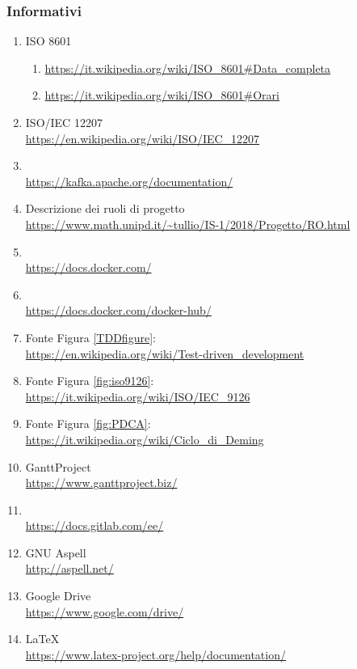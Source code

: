     \subsubsection{Informativi}	\label{rifinfo}
    \begin{enumerate}
    	\item ISO 8601
    	\begin{enumerate}
    		\item \url{https://it.wikipedia.org/wiki/ISO\_8601#Data_completa}
    		\item \url{https://it.wikipedia.org/wiki/ISO\_8601#Orari}
    	\end{enumerate}
    	\item ISO/IEC 12207 \\\url{https://en.wikipedia.org/wiki/ISO/IEC_12207}
		\item {} \\\url{https://kafka.apache.org/documentation/}
        \item Descrizione dei ruoli di progetto \\\url{https://www.math.unipd.it/~tullio/IS-1/2018/Progetto/RO.html}
        \item {} \\\url{https://docs.docker.com/}
        \item {} \\\url{https://docs.docker.com/docker-hub/}
        \item Fonte Figura \ref{TDDfigure}: \\\url{https://en.wikipedia.org/wiki/Test-driven_development}
        \item Fonte Figura \ref{fig:iso9126}: \\\url{https://it.wikipedia.org/wiki/ISO/IEC_9126}
        \item Fonte Figura \ref{fig:PDCA}: \\\url{https://it.wikipedia.org/wiki/Ciclo_di_Deming}
        \item GanttProject \\\url{https://www.ganttproject.biz/}
		\item {} \\\url{https://docs.gitlab.com/ee/}
		\item GNU Aspell \\\url{http://aspell.net/}
        \item Google Drive \\\url{https://www.google.com/drive/}
		\item \LaTeX\ \\\url{https://www.latex-project.org/help/documentation/}

\end{enumerate}
